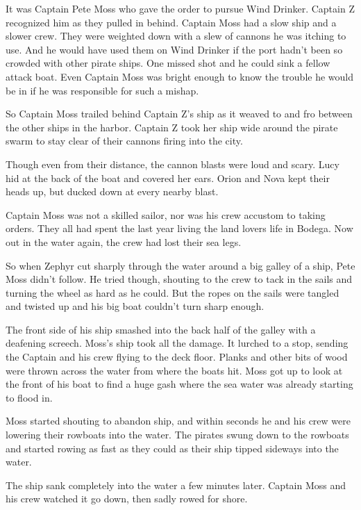 \documentclass[12pt]{extbook}
\begin{document}
  It was Captain Pete Moss who gave the order to pursue Wind Drinker.
  Captain Z recognized him as they pulled in behind. Captain Moss had a
  slow ship and a slower crew. They were weighted down with a slew of
  cannons he was itching to use. And he would have used them on Wind
  Drinker if the port hadn't been so crowded with other pirate ships. One
  missed shot and he could sink a fellow attack boat. Even Captain Moss
  was bright enough to know the trouble he would be in if he was
  responsible for such a mishap.
  
  So Captain Moss trailed behind Captain Z's ship as it weaved to and fro
  between the other ships in the harbor. Captain Z took her ship wide
  around the pirate swarm to stay clear of their cannons firing into the
  city.
  
  Though even from their distance, the cannon blasts were loud and scary.
  Lucy hid at the back of the boat and covered her ears. Orion and Nova
  kept their heads up, but ducked down at every nearby blast.
  
  Captain Moss was not a skilled sailor, nor was his crew accustom to
  taking orders. They all had spent the last year living the land lovers
  life in Bodega. Now out in the water again, the crew had lost their sea
  legs.
  
  So when Zephyr cut sharply through the water around a big galley of a
  ship, Pete Moss didn't follow. He tried though, shouting to the crew to
  tack in the sails and turning the wheel as hard as he could. But the
  ropes on the sails were tangled and twisted up and his big boat couldn't
  turn sharp enough.
  
  The front side of his ship smashed into the back half of the galley with
  a deafening screech. Moss's ship took all the damage. It lurched to a
  stop, sending the Captain and his crew flying to the deck floor. Planks
  and other bits of wood were thrown across the water from where the boats
  hit. Moss got up to look at the front of his boat to find a huge gash
  where the sea water was already starting to flood in.
  
  Moss started shouting to abandon ship, and within seconds he and his
  crew were lowering their rowboats into the water. The pirates swung down
  to the rowboats and started rowing as fast as they could as their ship
  tipped sideways into the water.
  
  The ship sank completely into the water a few minutes later. Captain
  Moss and his crew watched it go down, then sadly rowed for shore.
  
\end{document}
